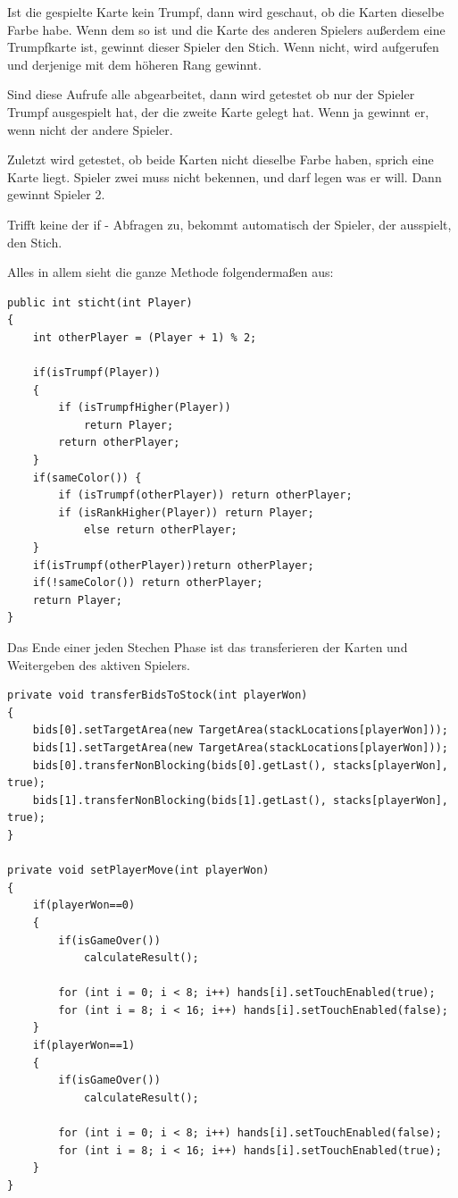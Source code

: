 Ist die gespielte Karte kein Trumpf, dann wird geschaut, ob die Karten dieselbe
Farbe habe. Wenn dem so ist und die Karte des anderen Spielers außerdem eine
Trumpfkarte ist, gewinnt dieser Spieler den Stich. Wenn nicht, wird
 aufgerufen und derjenige mit dem höheren Rang gewinnt.

Sind diese Aufrufe alle abgearbeitet, dann wird getestet ob nur der Spieler
Trumpf ausgespielt hat, der die zweite Karte gelegt hat. Wenn ja gewinnt er,
wenn nicht der andere Spieler.

Zuletzt wird getestet, ob beide Karten nicht dieselbe Farbe haben, sprich eine
Karte liegt. Spieler zwei muss nicht bekennen, und darf legen was er will. Dann
gewinnt Spieler 2.

Trifft keine der if - Abfragen zu, bekommt automatisch der Spieler, der
ausspielt, den Stich.

Alles in allem sieht die ganze Methode folgendermaßen aus:

\begin{lstlisting}[caption={sticht() Methode},captionpos=b]
public int sticht(int Player)
{
    int otherPlayer = (Player + 1) % 2;

    if(isTrumpf(Player))
    {
        if (isTrumpfHigher(Player))
            return Player;
        return otherPlayer;
    }
    if(sameColor()) {
        if (isTrumpf(otherPlayer)) return otherPlayer;
        if (isRankHigher(Player)) return Player;
            else return otherPlayer;
    }
    if(isTrumpf(otherPlayer))return otherPlayer;
    if(!sameColor()) return otherPlayer;
    return Player;
}
\end{lstlisting}

Das Ende einer jeden Stechen Phase ist das transferieren der Karten und
Weitergeben des aktiven Spielers.

\begin{lstlisting}[caption={TransferBidsToStock und setPlayerMove},captionpos=b]
private void transferBidsToStock(int playerWon)
{
    bids[0].setTargetArea(new TargetArea(stackLocations[playerWon]));
    bids[1].setTargetArea(new TargetArea(stackLocations[playerWon]));
    bids[0].transferNonBlocking(bids[0].getLast(), stacks[playerWon], true);
    bids[1].transferNonBlocking(bids[1].getLast(), stacks[playerWon], true);
}

private void setPlayerMove(int playerWon)
{
    if(playerWon==0)
    {
        if(isGameOver())
            calculateResult();

        for (int i = 0; i < 8; i++) hands[i].setTouchEnabled(true);
        for (int i = 8; i < 16; i++) hands[i].setTouchEnabled(false);
    }
    if(playerWon==1)
    {
        if(isGameOver())
            calculateResult();

        for (int i = 0; i < 8; i++) hands[i].setTouchEnabled(false);
        for (int i = 8; i < 16; i++) hands[i].setTouchEnabled(true);
    }
}
\end{lstlisting}

